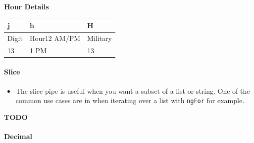 \documentclass[12pt,]{article}
\providecommand{\tightlist}{%
  \setlength{\itemsep}{0pt}\setlength{\parskip}{0pt}}
\let\oldparagraph\paragraph
\renewcommand{\paragraph}[1]{\oldparagraph{#1}\mbox{}}
\begin{document}
\textbf{Hour Details}

\begin{longtable}[c]{@{}lll@{}}
\toprule
\begin{minipage}[b]{0.10\columnwidth}\raggedright\strut
j
\strut\end{minipage} &
\begin{minipage}[b]{0.19\columnwidth}\raggedright\strut
h
\strut\end{minipage} &
\begin{minipage}[b]{0.14\columnwidth}\raggedright\strut
H
\strut\end{minipage}\tabularnewline
\midrule
\endhead
\begin{minipage}[t]{0.10\columnwidth}\raggedright\strut
Digit
\strut\end{minipage} &
\begin{minipage}[t]{0.19\columnwidth}\raggedright\strut
Hour12 AM/PM
\strut\end{minipage} &
\begin{minipage}[t]{0.14\columnwidth}\raggedright\strut
Military
\strut\end{minipage}\tabularnewline
\begin{minipage}[t]{0.10\columnwidth}\raggedright\strut
13
\strut\end{minipage} &
\begin{minipage}[t]{0.19\columnwidth}\raggedright\strut
1 PM
\strut\end{minipage} &
\begin{minipage}[t]{0.14\columnwidth}\raggedright\strut
13
\strut\end{minipage}\tabularnewline
\bottomrule
\end{longtable}

\paragraph{Slice}\label{slice}

\begin{itemize}
\tightlist
\item
  The slice pipe is useful when you want a subset of a list or string.
  One of the common use cases are in when iterating over a list with
  \texttt{ngFor} for example.
\end{itemize}

\textbf{TODO}

\paragraph{Decimal}\label{decimal}
\end{document}
